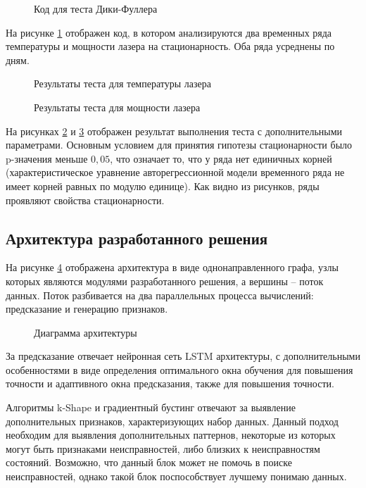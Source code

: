 \begin{figure}[H]
    \caption{Код для теста Дики-Фуллера}
    \label{fuller}
\end{figure}

На рисунке \ref{fuller} отображен код,
в котором анализируются два временных ряда температуры и мощности лазера на стационарность.
Оба ряда усреднены по дням.

\begin{figure}[H]
    \caption{Результаты теста для температуры лазера}
    \label{fullertemp}
\end{figure}

\begin{figure}[H]
    \caption{Результаты теста для мощности лазера}
    \label{fullerpower}
\end{figure}

На рисунках \ref{fullertemp} и \ref{fullerpower} отображен результат
выполнения теста с дополнительными параметрами.
Основным условием для принятия гипотезы стационарности
было p-значения меньше $0,05$,
что означает то,
что у ряда нет единичных корней 
(характеристическое уравнение авторегрессионной модели временного ряда не имеет корней равных по модулю единице).
Как видно из рисунков, ряды проявляют свойства стационарности.


\subsection{Архитектура разработанного решения}

На рисунке \ref{pipeline} отображена архитектура
в виде однонаправленного графа,
узлы которых являются модулями разработанного решения,
а вершины -- поток данных.
Поток разбивается на два параллельных
процесса вычислений: предсказание и генерацию признаков.

\begin{figure}[H]
    \caption{Диаграмма архитектуры}
    \label{pipeline}
\end{figure}

За предсказание отвечает нейронная сеть LSTM архитектуры,
с дополнительными особенностями в виде определения
оптимального окна обучения для повышения точности
и адаптивного окна предсказания,
также для повышения точности.

Алгоритмы k-Shape и градиентный бустинг
отвечают за выявление дополнительных признаков,
характеризующих набор данных.
Данный подход необходим для выявления
дополнительных паттернов,
некоторые из которых могут быть признаками неисправностей,
либо близких к неисправностям состояний.
Возможно, что данный блок может не помочь
в поиске неисправностей, однако такой блок поспособствует лучшему понимаю данных.

